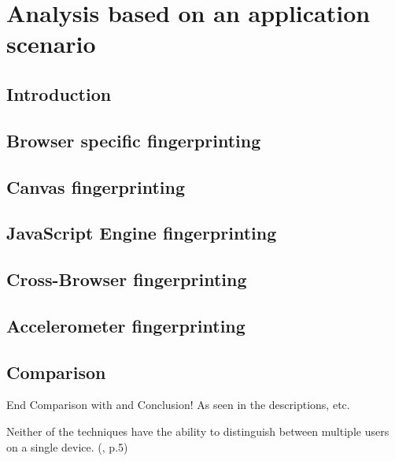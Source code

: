 \chapter{Analysis based on an application scenario}
\label{cha:ApplicationScenario}

\section{Introduction}
\section{Browser specific fingerprinting}
\section{Canvas fingerprinting}
\section{JavaScript Engine fingerprinting}
\section{Cross-Browser fingerprinting}
\section{Accelerometer fingerprinting}

\section{Comparison}
End Comparison with and Conclusion!
As seen in the descriptions, etc.

Neither of the techniques have the ability to distinguish between multiple users on a single device.  (\textcite{upi15}, p.5)

